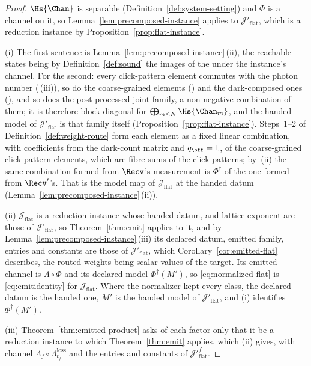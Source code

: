 \begin{proof}
$\Hs{\Chan}$ is separable (Definition~\ref{def:system-setting}) and $\Phi$ is
a channel on it, so Lemma~\ref{lem:precomposed-instance} applies to
$\mathcal{J}'_{\mathrm{flat}}$, which is a reduction instance by
Proposition~\ref{prop:flat-instance}.

(i) The first sentence is Lemma~\ref{lem:precomposed-instance}\,(ii), the
reachable states being by Definition~\ref{def:sound} the images of the
 under the instance's channel. For the
second: every click-pattern element commutes with the photon number
(\,(iii)), so do the coarse-grained elements
() and the dark-composed ones
(), and so does the
post-processed joint family, a non-negative combination of them; it is
therefore block diagonal for $\bigoplus_{m\le N}\Hs{\Chan_m}$, and the handed
model of $\mathcal{J}'_{\mathrm{flat}}$ is that family itself
(Proposition~\ref{prop:flat-instance}). Steps~1--2 of
Definition~\ref{def:weight-route} form each element as a fixed linear
combination, with coefficients from the dark-count matrix and $q_{\off}=1$, of
the coarse-grained click-pattern elements, which are fibre sums of the click
patterns; by
\,(ii) the
same combination formed from $\Recv$'s measurement is $\Phi^{\dagger}$ of the
one formed from $\Recv'$'s. That is the model map of
$\mathcal{J}_{\mathrm{flat}}$ at the handed datum
(Lemma~\ref{lem:precomposed-instance}\,(ii)).

(ii) $\mathcal{J}_{\mathrm{flat}}$ is a reduction instance whose handed datum,
 and lattice exponent are those of
$\mathcal{J}'_{\mathrm{flat}}$, so Theorem~\ref{thm:emit} applies to it, and
by Lemma~\ref{lem:precomposed-instance}\,(iii) its declared datum, emitted
family, entries and constants are those of $\mathcal{J}'_{\mathrm{flat}}$,
which Corollary~\ref{cor:emitted-flat} describes, the routed weights being
scalar values of the target. Its emitted channel is $\Lambda\circ\Phi$ and
its declared model $\Phi^{\dagger}(M')$, so \eqref{eq:normalized-flat} is
\eqref{eq:emitidentity} for $\mathcal{J}_{\mathrm{flat}}$. Where the
normalizer kept every class, the declared datum is the handed one, $M'$ is the
handed model of $\mathcal{J}'_{\mathrm{flat}}$, and (i) identifies
$\Phi^{\dagger}(M')$.

(iii) Theorem~\ref{thm:emitted-product} asks of each factor only that it be a
reduction instance to which Theorem~\ref{thm:emit} applies, which (ii) gives,
with channel $\Lambda_f\circ\Lambda^{\mathrm{loss}}_{t_f}$ and the entries
and constants of $\mathcal{J}'^{f}_{\mathrm{flat}}$.


\end{proof}
